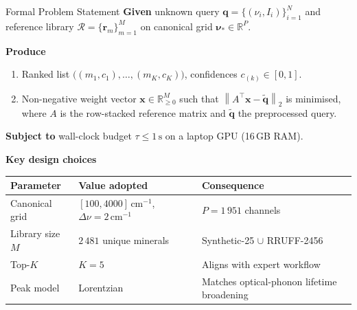\documentclass[aspectratio=169,10pt]{beamer}
\newcommand{\norm}[1]{\left\|#1\right\|}
\begin{document}
\begin{frame}{Formal Problem Statement}
  \textbf{\color{accent}Given}\enspace
  unknown query $\mathbf{q}=\{(\nu_i,I_i)\}_{i=1}^N$ and reference
  library $\mathcal{R}=\{\mathbf{r}_m\}_{m=1}^M$ on canonical grid
  $\boldsymbol{\nu}_*\in\mathbb{R}^P$.

  \vspace{0.12cm}
  \textbf{\color{accent}Produce}
  \begin{enumerate}\setlength\itemsep{0.08cm}\small
    \item Ranked list $\bigl((m_1,c_1),\ldots,(m_K,c_K)\bigr)$,\quad
          confidences $c_{(k)}\in[0,1]$.
    \item Non-negative weight vector
          $\mathbf{x}\in\mathbb{R}^M_{\ge0}$ such that
          $\norm{A^\top\mathbf{x}-\tilde{\mathbf{q}}}_2$ is minimised,
          where $A$ is the row-stacked reference matrix and $\tilde{\mathbf{q}}$
          the preprocessed query.
  \end{enumerate}

  \smallskip
  \textbf{\color{accent}Subject to}\enspace
  wall-clock budget $\tau\le 1\,\text{s}$ on a laptop GPU (16\,GB RAM).

  \vspace{0.18cm}
  {\small\bfseries\color{headerbg}Key design choices}

  \smallskip
  \footnotesize
  \begin{tabular}{@{}llp{4.6cm}@{}}
    \toprule
    \textbf{Parameter} & \textbf{Value adopted} & \textbf{Consequence}\\
    \midrule
    Canonical grid & $[100,4000]\,\text{cm}^{-1}$, $\Delta\nu=2\,\text{cm}^{-1}$
                   & $P=1\,951$ channels\\[1pt]
    Library size $M$ & $2\,481$ unique minerals
                     & Synthetic-25 $\cup$ RRUFF-2456\\[1pt]
    Top-$K$          & $K=5$  & Aligns with expert workflow\\[1pt]
    Peak model       & Lorentzian & Matches optical-phonon lifetime broadening\\
    \bottomrule
  \end{tabular}
\end{frame}
\end{document}
